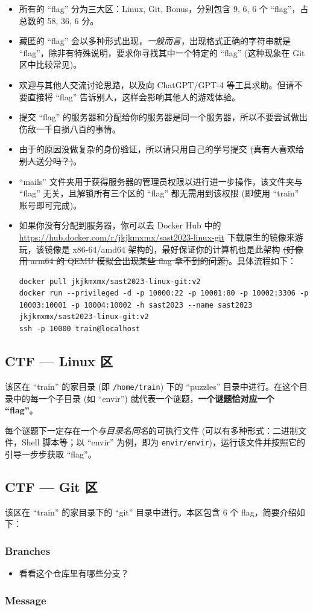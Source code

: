 \documentclass{article}
\begin{document}
	\begin{itemize}
		\itemsep0pt
		\item 所有的 ``flag'' 分为三大区：Linux, Git, Bonus，分别包含 9, 6, 6 个 ``flag''，占总数的 58, 36, 6 分。
		\item 藏匿的 ``flag'' 会以多种形式出现，\textit{一般而言}，出现格式正确的字符串就是 ``flag''，除非有特殊说明，要求你寻找其中一个特定的 ``flag'' (这种现象在 Git 区中比较常见)。
		\item 欢迎与其他人交流讨论思路，以及向 ChatGPT/GPT-4 等工具求助。但请不要直接将 ``flag'' 告诉别人，这样会影响其他人的游戏体验。
		\item 提交 ``flag'' 的服务器和分配给你的服务器是同一个服务器，所以不要尝试做出伤敌一千自损八百的事情。
		\item 由于的原因没做复杂的身份验证，所以请只用自己的学号提交 \sout{(真有人喜欢给别人送分吗？)}。
		\item ``mails'' 文件夹用于获得服务器的管理员权限以进行进一步操作，该文件夹与 ``flag'' 无关，且解锁所有三个区的 ``flag'' 都无需用到该权限 (即使用 ``train'' 账号即可完成)。
		\item 如果你没有分配到服务器，你可以去 Docker Hub 中的 \url{https://hub.docker.com/r/jkjkmxmx/sast2023-linux-git} 下载原生的镜像来游玩，该镜像是 x86-64/amd64 架构的，最好保证你的计算机也是此架构 \sout{(好像用 arm64 的 QEMU 模拟会出现某些 flag 拿不到的问题)}。具体流程如下：
		\begin{verbatim}
docker pull jkjkmxmx/sast2023-linux-git:v2
docker run --privileged -d -p 10000:22 -p 10001:80 -p 10002:3306 -p 10003:10001 -p 10004:10002 -h sast2023 --name sast2023 jkjkmxmx/sast2023-linux-git:v2
ssh -p 10000 train@localhost
		\end{verbatim}
	\end{itemize}

	\subsection{CTF --- Linux 区}

	该区在 ``train'' 的家目录 (即 \texttt{/home/train}) 下的 ``puzzles'' 目录中进行。在这个目录中的每一个子目录 (如 ``envir'') 就代表一个谜题，\textbf{一个谜题恰对应一个 ``flag''}。

	每个谜题下一定存在一个\textit{与目录名同名}的可执行文件 (可以有多种形式：二进制文件，Shell 脚本等；以 ``envir'' 为例，即为 \texttt{envir/envir})，运行该文件并按照它的引导一步步获取 ``flag''。

	\subsection{CTF --- Git 区}

	该区在 ``train'' 的家目录下的 ``git'' 目录中进行。本区包含 6 个 flag，简要介绍如下：

	\subsubsection{Branches}

	\begin{itemize}
		\item 看看这个仓库里有哪些分支？
	\end{itemize}

	\subsubsection{Message}

	\
\end{document}
